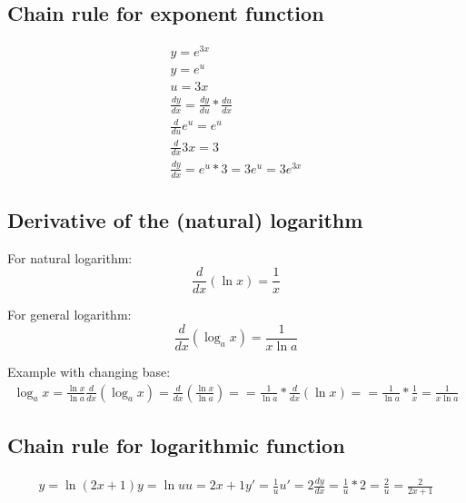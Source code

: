 \documentclass{article}
\begin{document}
\subsection{Chain rule for exponent function}
\begin{equation}
  \begin{gathered}
    y = e^{3x} \\
    y = e^u \\
    u = 3x \\
    \frac{dy}{dx} = \frac{dy}{du} * \frac{du}{dx} \\
    \frac{d}{du} e^u = e^u \\
    \frac{d}{dx} 3x = 3 \\
    \frac{dy}{dx} = e^u * 3 = 3e^u = 3e^{3x}
  \end{gathered}
\end{equation}

\subsection{Derivative of the (natural) logarithm}
For natural logarithm:
\begin{equation}
  \frac{d}{dx}(\ln x) = \frac{1}{x}
\end{equation}

For general logarithm:
\begin{equation}
  \frac{d}{dx}(\log_a x) = \frac{1}{x\ln a}
\end{equation}

Example with changing base:
\begin{equation}
  \begin{gathered}
  \log_ax = \frac{\ln x}{\ln a}
  \frac{d}{dx}(\log_ax) = \frac{d}{dx}(\frac{\ln x}{\ln a}) =
  = \frac{1}{\ln a} * \frac{d}{dx}(\ln x) =
  = \frac{1}{\ln a} * \frac{1}{x} = \frac{1}{x\ln a}
  \end{gathered}
\end{equation}
\subsection{Chain rule for logarithmic function}
\begin{equation}
  \begin{gathered}
  y = \ln(2x+1)
  y = \ln u
  u = 2x+1
  y' = \frac{1}{u}
  u' = 2
  \frac{dy}{dx} = \frac{1}{u} * 2 = \frac{2}{u} = \frac{2}{2x+1}
  \end{gathered}
\end{equation}
\end{document}
